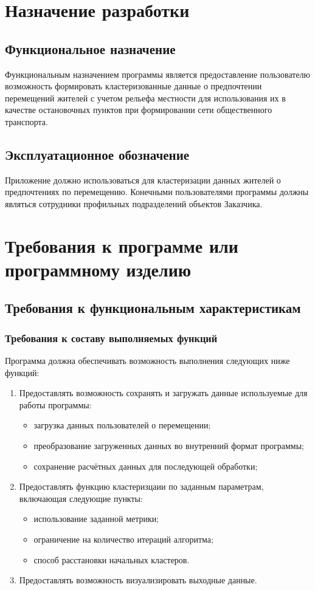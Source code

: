 \chapter{Назначение разработки}
\section{Функциональное назначение}
Функциональным назначением программы является предоставление пользователю возможность формировать кластеризованные данные о предпочтении перемещений жителей с учетом рельефа местности для использования их в качестве остановочных пунктов при формировании сети общественного транспорта.

\section{Эксплуатационное обозначение}
Приложение должно использоваться для кластеризации данных жителей о предпочтениях по перемещению. Конечными пользователями программы должны являться сотрудники профильных подразделений объектов Заказчика.

\chapter{Требования к программе или программному изделию}
\section{Требования к функциональным характеристикам}
\subsection{Требования к составу выполняемых функций}
Программа должна обеспечивать возможность выполнения следующих ниже функций:
\begin{enumerate}
    \item Предоставлять возможность сохранять и загружать данные используемые для работы программы:
    \begin{itemize}
        \item загрузка данных пользователей о перемещении;
        \item преобразование загруженных данных во внутренний формат программы;
        \item сохранение расчётных данных для последующей обработки;
    \end{itemize}
    \item Предоставлять функцию кластеризцаии по заданным параметрам, включающая следующие пункты:
    \begin{itemize}
        \item использование заданной метрики;
        \item ограничение на количество итераций алгоритма;
        \item способ расстановки начальных кластеров.
    \end{itemize}
    \item Предоставлять возможность визуализировать выходные данные.
\end{enumerate}

